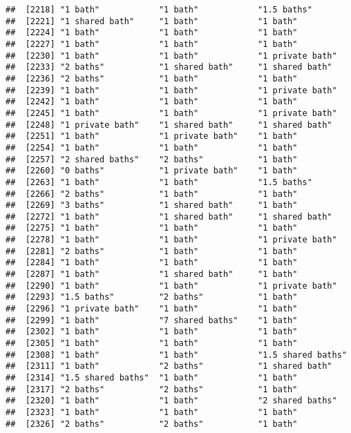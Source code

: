 \documentclass[
]{article}
\begin{document}
\begin{verbatim}
##  [2218] "1 bath"            "1 bath"            "1.5 baths"        
##  [2221] "1 shared bath"     "1 bath"            "1 bath"           
##  [2224] "1 bath"            "1 bath"            "1 bath"           
##  [2227] "1 bath"            "1 bath"            "1 bath"           
##  [2230] "1 bath"            "1 bath"            "1 private bath"   
##  [2233] "2 baths"           "1 shared bath"     "1 shared bath"    
##  [2236] "2 baths"           "1 bath"            "1 bath"           
##  [2239] "1 bath"            "1 bath"            "1 private bath"   
##  [2242] "1 bath"            "1 bath"            "1 bath"           
##  [2245] "1 bath"            "1 bath"            "1 private bath"   
##  [2248] "1 private bath"    "1 shared bath"     "1 shared bath"    
##  [2251] "1 bath"            "1 private bath"    "1 bath"           
##  [2254] "1 bath"            "1 bath"            "1 bath"           
##  [2257] "2 shared baths"    "2 baths"           "1 bath"           
##  [2260] "0 baths"           "1 private bath"    "1 bath"           
##  [2263] "1 bath"            "1 bath"            "1.5 baths"        
##  [2266] "2 baths"           "1 bath"            "1 bath"           
##  [2269] "3 baths"           "1 shared bath"     "1 bath"           
##  [2272] "1 bath"            "1 shared bath"     "1 shared bath"    
##  [2275] "1 bath"            "1 bath"            "1 bath"           
##  [2278] "1 bath"            "1 bath"            "1 private bath"   
##  [2281] "2 baths"           "1 bath"            "1 bath"           
##  [2284] "1 bath"            "1 bath"            "1 bath"           
##  [2287] "1 bath"            "1 shared bath"     "1 bath"           
##  [2290] "1 bath"            "1 bath"            "1 private bath"   
##  [2293] "1.5 baths"         "2 baths"           "1 bath"           
##  [2296] "1 private bath"    "1 bath"            "1 bath"           
##  [2299] "1 bath"            "7 shared baths"    "1 bath"           
##  [2302] "1 bath"            "1 bath"            "1 bath"           
##  [2305] "1 bath"            "1 bath"            "1 bath"           
##  [2308] "1 bath"            "1 bath"            "1.5 shared baths" 
##  [2311] "1 bath"            "2 baths"           "1 shared bath"    
##  [2314] "1.5 shared baths"  "1 bath"            "1 bath"           
##  [2317] "2 baths"           "2 baths"           "1 bath"           
##  [2320] "1 bath"            "1 bath"            "2 shared baths"   
##  [2323] "1 bath"            "1 bath"            "1 bath"           
##  [2326] "2 baths"           "2 baths"           "1 bath"           

\end{verbatim}
\end{document}
